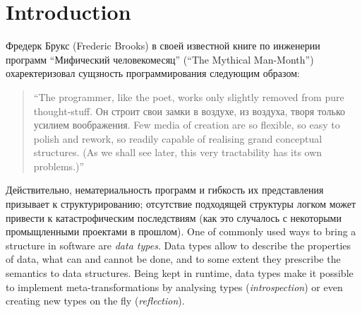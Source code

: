 \section{Introduction}

Фредерк Брукс (Frederic Brooks) в своей известной книге по инженерии
программ  ``Мифический человекомесяц'' (``The Mythical Man-Month'')~\cite{MMM} охаректеризовал сущзность программирования следующим образом:

\blockquote{``The programmer, like the poet, works only slightly removed from pure thought-stuff. Он строит свои замки в воздухе, из воздуха, творя только усилием воображения. Few media of
creation are so flexible, so easy to polish and rework, so readily capable of realising grand conceptual structures. (As we shall see later, this very tractability has its own problems.)''}

Действительно, нематериальность программ и гибкость их представления  призывает к структурированию; отсутствие подходящей структуры логком может привести к катастрофическим последствиям
(как это случалось с некоторыми промыщленными проектами в прошлом). One of commonly used ways to bring a
structure in software are \emph{data types}. Data types allow to describe the properties of data, what can and cannot be done, and to some extent they prescribe
the semantics to data structures. Being kept in runtime, data types make it possible to implement meta-transformations by analysing types (\emph{introspection})
or even creating new types on the fly (\emph{reflection}).

